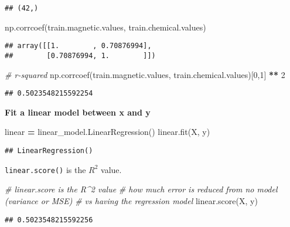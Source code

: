 \documentclass[
]{book}
\newenvironment{Shaded}{\begin{snugshade}}{\end{snugshade}}
\newcommand{\CommentTok}[1]{\textcolor[rgb]{0.56,0.35,0.01}{\textit{#1}}}
\newcommand{\DecValTok}[1]{\textcolor[rgb]{0.00,0.00,0.81}{#1}}
\newcommand{\NormalTok}[1]{#1}
\newcommand{\OperatorTok}[1]{\textcolor[rgb]{0.81,0.36,0.00}{\textbf{#1}}}
\begin{document}
\begin{verbatim}
## (42,)
\end{verbatim}

\begin{Shaded}
\begin{Highlighting}[]
\NormalTok{np.corrcoef(train.magnetic.values, train.chemical.values)}
\end{Highlighting}
\end{Shaded}

\begin{verbatim}
## array([[1.        , 0.70876994],
##        [0.70876994, 1.        ]])
\end{verbatim}

\begin{Shaded}
\begin{Highlighting}[]
\CommentTok{\# r{-}squared}
\NormalTok{np.corrcoef(train.magnetic.values, train.chemical.values)[}\DecValTok{0}\NormalTok{,}\DecValTok{1}\NormalTok{] }\OperatorTok{**} \DecValTok{2}
\end{Highlighting}
\end{Shaded}

\begin{verbatim}
## 0.5023548215592254
\end{verbatim}

\textbf{Fit a linear model between x and y}

\begin{Shaded}
\begin{Highlighting}[]
\NormalTok{linear }\OperatorTok{=}\NormalTok{ linear\_model.LinearRegression()}
\NormalTok{linear.fit(X, y)}
\end{Highlighting}
\end{Shaded}

\begin{verbatim}
## LinearRegression()
\end{verbatim}

\texttt{linear.score()} is the \(R^2\) value.

\begin{Shaded}
\begin{Highlighting}[]
\CommentTok{\# linear.score is the R\^{}2 value}
\CommentTok{\# how much error is reduced from no model (variance or MSE)}
\CommentTok{\# vs having the regression model}
\NormalTok{linear.score(X, y)}
\end{Highlighting}
\end{Shaded}

\begin{verbatim}
## 0.5023548215592256
\end{verbatim}
\end{document}
